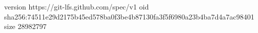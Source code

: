 version https://git-lfs.github.com/spec/v1
oid sha256:74511e29d2175b45ed578ba0f3be4b87130fa3f5f6980a23b4ba7d4a7ac98401
size 28982797

